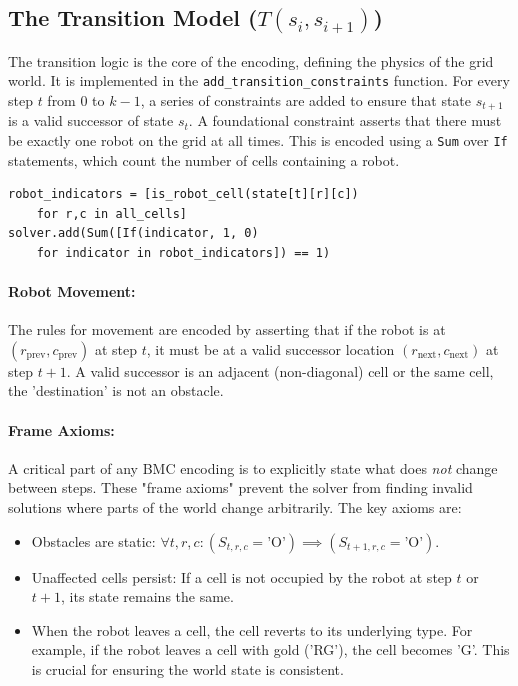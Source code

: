 \documentclass[12pt, a4paper, oneside]{report} %
\begin{document}
\subsection{The Transition Model ($T(s_i, s_{i+1})$)}
The transition logic is the core of the encoding, defining the physics of the grid world. It is implemented in the \texttt{add\_transition\_constraints} function. For every step $t$ from $0$ to $k-1$, a series of constraints are added to ensure that state $s_{t+1}$ is a valid successor of state $s_t$.
A foundational constraint asserts that there must be exactly one robot on the grid at all times. This is encoded using a \texttt{Sum} over \texttt{If} statements, which count the number of cells containing a robot.
\begin{verbatim}
robot_indicators = [is_robot_cell(state[t][r][c]) 
    for r,c in all_cells]
solver.add(Sum([If(indicator, 1, 0) 
    for indicator in robot_indicators]) == 1)
\end{verbatim}

\paragraph{Robot Movement:} The rules for movement are encoded by asserting that if the robot is at $(r_{\text{prev}}, c_{\text{prev}})$ at step $t$, it must be at a valid successor location $(r_{\text{next}}, c_{\text{next}})$ at step $t+1$. A valid successor is an adjacent (non-diagonal) cell or the same cell, the 'destination' is not an obstacle.
\paragraph{Frame Axioms:} A critical part of any BMC encoding is to explicitly state what does \textit{not} change between steps. These "frame axioms" prevent the solver from finding invalid solutions where parts of the world change arbitrarily. The key axioms are:
\begin{itemize}
    \item Obstacles are static: $\forall t,r,c: (S_{t,r,c} = \text{'O'}) \implies (S_{t+1,r,c} = \text{'O'})$.
    \item Unaffected cells persist: If a cell is not occupied by the robot at step $t$ or $t+1$, its state remains the same.
    \item When the robot leaves a cell, the cell reverts to its underlying type. For example, if the robot leaves a cell with gold ('RG'), the cell becomes 'G'. This is crucial for ensuring the world state is consistent.
\end{itemize}
\end{document}

